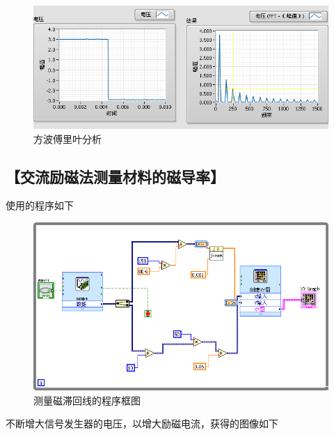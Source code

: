 \documentclass{ctexart}
\let\oldsubsection\subsection
\renewcommand{\subsection}[1]{\oldsubsection{\!\!\!\!\!\!【#1】}}
\begin{document}
\begin{figure}[H]
  \centering
  \includegraphics[width=0.98\linewidth]{LabVIEW使用基础/周期电信号的傅里叶分析/方波.PNG}
  \caption{方波傅里叶分析}
\end{figure}

\newpage
\subsection{交流励磁法测量材料的磁导率}

使用的程序如下

\begin{figure}[H]
  \centering
  \includegraphics[width=0.98\linewidth]{LabVIEW使用基础/铁材料的磁滞现象和磁滞回线/测量程序.png}
  \caption{测量磁滞回线的程序框图}
\end{figure}

不断增大信号发生器的电压，以增大励磁电流，获得的图像如下
\end{document}
